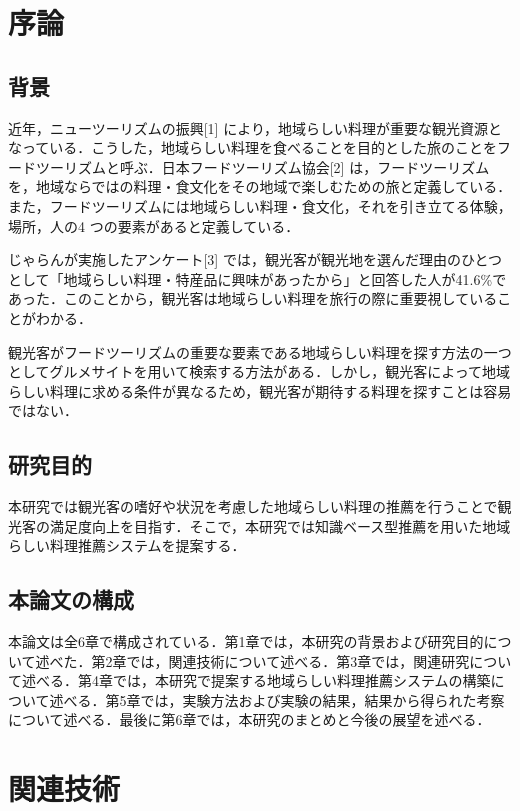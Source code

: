 \documentclass{funthesis}
\begin{document}
\chapter{序論} 

\section{背景}
近年，ニューツーリズムの振興[1] により，地域らしい料理が重要な観光資源となっている．こうした，地域らしい料理を食べることを目的とした旅のことをフードツーリズムと呼ぶ．日本フードツーリズム協会[2] は，フードツーリズムを，地域ならではの料理・食文化をその地域で楽しむための旅と定義している．また，フードツーリズムには地域らしい料理・食文化，それを引き立てる体験，場所，人の4 つの要素があると定義している．

じゃらんが実施したアンケート[3] では，観光客が観光地を選んだ理由のひとつとして「地域らしい料理・特産品に興味があったから」と回答した人が41.6\%であった．このことから，観光客は地域らしい料理を旅行の際に重要視していることがわかる．

観光客がフードツーリズムの重要な要素である地域らしい料理を探す方法の一つとしてグルメサイトを用いて検索する方法がある．しかし，観光客によって地域らしい料理に求める条件が異なるため，観光客が期待する料理を探すことは容易ではない．

\section{研究目的}  
本研究では観光客の嗜好や状況を考慮した地域らしい料理の推薦を行うことで観光客の満足度向上を目指す．そこで，本研究では知識ベース型推薦を用いた地域らしい料理推薦システムを提案する．

\section{本論文の構成}
本論文は全6章で構成されている．第1章では，本研究の背景および研究目的について述べた．第2章では，関連技術について述べる．第3章では，関連研究について述べる．第4章では，本研究で提案する地域らしい料理推薦システムの構築について述べる．第5章では，実験方法および実験の結果，結果から得られた考察について述べる．最後に第6章では，本研究のまとめと今後の展望を述べる．

\chapter{関連技術}
\end{document}
